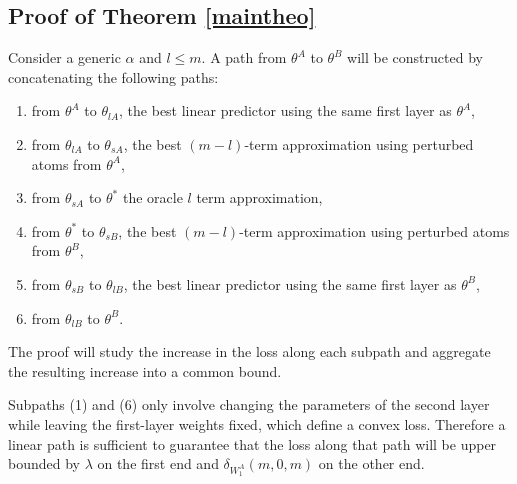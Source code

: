\subsection{Proof of Theorem \ref{maintheo}}

Consider a generic $\alpha$ and $l \leq m$. A path from $\theta^A$ to $\theta^B$ will be constructed 
by concatenating the following paths:
\begin{enumerate}
\item from $\theta^A$ to $\theta_{lA}$, the 
best linear predictor using the same first layer as $\theta^A$, 
\item from $\theta_{lA}$ to $\theta_{sA}$, the best $(m-l)$-term approximation using perturbed 
atoms from $\theta^A$,
\item from $\theta_{sA}$ to $\theta^*$ the oracle $l$ term approximation,  
\item from $\theta^*$ to $\theta_{sB}$, the best $(m-l)$-term approximation using perturbed 
atoms from $\theta^B$,
\item from $\theta_{sB}$ to $\theta_{lB}$, the 
best linear predictor using the same first layer as $\theta^B$, 
\item from $\theta_{lB}$ to $\theta^{B}$.
\end{enumerate}
The proof will study the increase in the loss along each subpath and aggregate 
the resulting increase into a common bound. 

Subpaths (1) and (6) only involve changing the parameters of the second layer 
while leaving the first-layer weights fixed, which define a convex loss. Therefore a linear path is sufficient to guarantee that 
the loss along that path will be upper bounded by $\lambda$ on the first end 
and $\delta_{W_1^A}(m,0,m)$ on the other end. 

